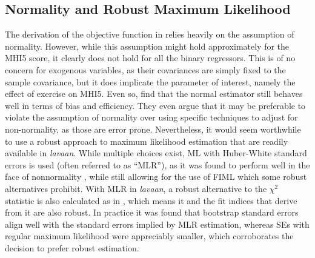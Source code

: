 \subsection{Normality and Robust Maximum Likelihood}
\label{sec:methods:normality_mlr}
The derivation of the objective function in  relies heavily on the assumption
of normality. However, while this assumption might hold approximately for the MHI5 score, it clearly does not hold
for all the binary regressors. This is of no concern for exogenous variables, as their covariances are simply fixed
to the sample covariance, but it does implicate the parameter of interest, namely the effect of exercise on MHI5.
Even so,  find that the normal estimator still behaves well in terms of bias and
efficiency. They even argue that it may be preferable to violate the assumption of normality over using specific
techniques to adjust for non-normality, as those are error prone.
Nevertheless, it would seem worthwhile to use a robust approach to maximum likelihood estimation that are readily
available in \textit{lavaan}. While multiple choices exist, ML with Huber-White standard errors is used (often
referred to as ``MLR''), as it was found to perform well in the face of nonnormality \cite{zhong2011bias}, while
still allowing for the use of FIML which some robust alternatives prohibit.
With MLR in \textit{lavaan}, a robust alternative to the $\chi^2$ statistic is also calculated as in ,
which means it and the fit indices that derive from it are also robust.
In practice it was found that bootstrap standard errors align well with the standard errors implied by MLR estimation,
whereas SEs with regular maximum likelihood were appreciably smaller, which corroborates the decision to prefer
robust estimation.
